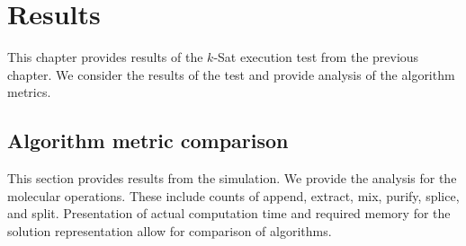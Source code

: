 \chapter{Results}

This chapter provides results of the $k$-{\sc Sat} execution test from the previous chapter.  We consider the results of the test and provide analysis of the algorithm metrics.  

	\section{Algorithm metric comparison}
	
This section provides results from the simulation.  We provide the analysis for the molecular operations.  These include counts of append, extract, mix, purify, splice, and split.  Presentation of actual computation time and required memory for the solution representation allow for comparison of algorithms.

\FloatBarrier
		

